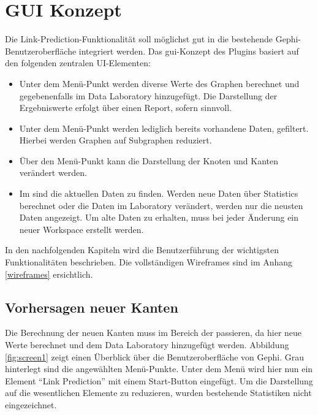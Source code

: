 \section{GUI Konzept}

Die Link-Prediction-Funktionalität soll möglichst gut in die bestehende Gephi-Benutzeroberfläche integriert werden.
Das \acs{gui}-Konzept des Plugins basiert auf den folgenden zentralen UI-Elementen:

\begin{itemize}
    \item Unter dem Menü-Punkt  werden diverse Werte des Graphen berechnet und gegebenenfalls im Data Laboratory
          hinzugefügt. Die Darstellung der Ergebniswerte erfolgt über einen Report, sofern sinnvoll.
    \item Unter dem Menü-Punkt  werden lediglich bereits vorhandene Daten, gefiltert. Hierbei werden Graphen auf Subgraphen reduziert.
    \item Über den Menü-Punkt  kann die Darstellung der Knoten und Kanten verändert werden.
    \item Im  sind die aktuellen Daten zu finden. Werden neue Daten über Statistics berechnet
          oder die Daten im Laboratory verändert, werden nur die neusten Daten angezeigt. Um alte Daten zu erhalten,
          muss bei jeder Änderung ein neuer Workspace erstellt werden.
\end{itemize}

In den nachfolgenden Kapiteln wird die Benutzerführung der wichtigsten Funktionalitäten beschrieben.
Die vollständigen Wireframes sind im Anhang \ref{wireframes} ersichtlich.

\subsection{Vorhersagen neuer Kanten}

Die Berechnung der neuen Kanten muss im Bereich der  passieren, da hier neue Werte berechnet und dem
Data Laboratory hinzugefügt werden. Abbildung \ref{fig:screen1} zeigt einen Überblick über die Benutzeroberfläche von Gephi. Grau hinterlegt sind die
angewählten Menü-Punkte. Unter dem Menü  wird hier nun ein Element ``Link Prediction'' mit einem
Start-Button eingefügt. Um die Darstellung auf die wesentlichen Elemente zu reduzieren, wurden bestehende Statistiken
nicht eingezeichnet.


